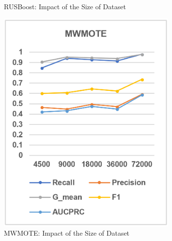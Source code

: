 \begin{figure}[H]
\begin{minipage}{0.31\textwidth}
        \caption{RUSBoost: Impact of the Size of Dataset}
        \label{fig25}
    \end{minipage}
    \hspace{5pt}
    \begin{minipage}{0.31\textwidth}
        \centering
        \includegraphics[width=0.8\textwidth]{images/fig26}
        \caption{MWMOTE: Impact of the Size of Dataset}
        \label{fig26}
    \end{minipage}
\end{figure}

